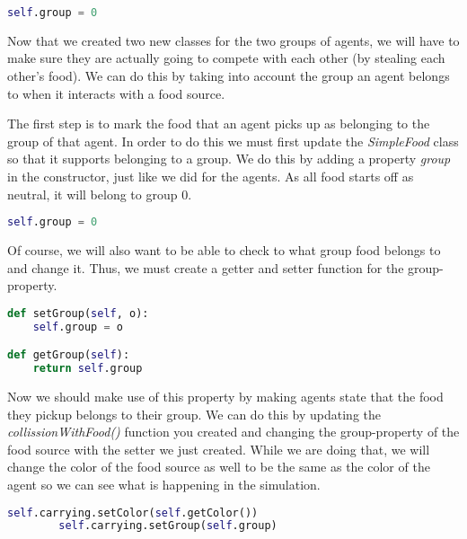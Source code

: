 \begin{lstlisting}[language=Python]
self.group = 0
\end{lstlisting}

Now that we created two new classes for the two groups of agents, we will have to make sure they are actually going to compete with each other (by stealing each other's food). We can do this by taking into account the group an agent belongs to when it interacts with a food source. 

The first step is to mark the food that an agent picks up as belonging to the group of that agent. In order to do this we must first update the \textit{SimpleFood} class so that it supports belonging to a group. We do this by adding a property \textit{group} in the constructor, just like we did for the agents. As all food starts off as neutral, it will belong to group 0. 


\begin{lstlisting}[language=Python]
self.group = 0
\end{lstlisting}

Of course, we will also want to be able to check to what group food belongs to and change it. Thus, we must create a getter and setter function for the group-property.


\begin{lstlisting}[language=Python]
def setGroup(self, o):
	self.group = o

def getGroup(self):
	return self.group
\end{lstlisting}

Now we should make use of this property by making agents state that the food they pickup belongs to their group. We can do this by updating the \textit{collissionWithFood()} function you created and changing the group-property of the food source with the setter we just created. While we are doing that, we will change the color of the food source as well to be the same as the color of the agent so we can see what is happening in the simulation.


\begin{lstlisting}[language=Python]
		self.carrying.setColor(self.getColor())
		self.carrying.setGroup(self.group)
\end{lstlisting}

